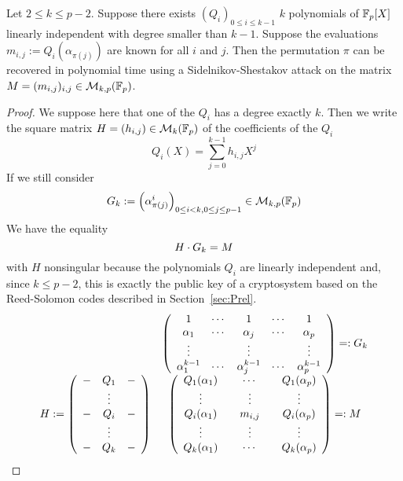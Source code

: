 \documentclass[a4paper]{article}
\newcommand{\GF}[1]{\F_{#1}}
\begin{document}
\begin{theorem}
\label{thm:link}
Let $2 \leq k \leq p-2$.
Suppose there exists $(Q_i)_{0 \leq i \leq k-1}$ $k$ polynomials of $\GF{p}[X]$ linearly independent with degree smaller than $k-1$.
Suppose the evaluations $m_{i,j} := Q_i(\alpha_{\pi(j)})$ are known for all $i$ and $j$.
Then the permutation $\pi$ can be recovered in polynomial time using a Sidelnikov-Shestakov attack on the matrix $M = (m_{i,j})_{i,j} \in \mathcal{M}_{k,p}(\GF{p})$.
\end{theorem}
\begin{proof}
We suppose here that one of the $Q_i$ has a degree exactly $k$.
Then we write the square matrix $H = (h_{i,j}) \in \mathcal{M}_k(\GF{p})$ of the coefficients of the $Q_i$
$$ Q_i(X) = \sum_{j=0}^{k-1} h_{i,j} X^j $$
If we still consider
$$ \A_k := \left( \alpha_{\pi(j)}^i \right)_{0 \leq i < k, 0 \leq j \leq p-1} \in \mathcal{M}_{k,p}(\GF{p})$$
We have the equality
$$ H \cdot G_k = M$$
with $H$ nonsingular because the polynomials $Q_i$ are linearly independent and, since $k \leq p-2$, this is exactly the public key of a cryptosystem based on the Reed-Solomon codes described in Section~\ref{sec:Prel}.
$$
\begin{array}{ccl}
& \left( \begin{array}{ccccc}
1&\cdots&1&\cdots&1\\
\alpha_1&\cdots&\alpha_j&\cdots&\alpha_p\\
\vdots&&\vdots&&\vdots \\
\alpha_1^{k-1}&\cdots&\alpha_j^{k-1}&\cdots&\alpha_p^{k-1}
\end{array} \right) =: G_k \\
H := \left( \begin{array}{ccc}
-&Q_1&-  \\
&\vdots& \\
-&Q_i&-  \\
&\vdots& \\
-&Q_k&-
\end{array} \right) &
\left( \begin{array}{ccccc}
Q_1(\alpha_1)&&\cdots&&Q_1(\alpha_p)\\
\vdots&&\vdots&&\vdots \\
Q_i(\alpha_1)&&m_{i,j}&&Q_i(\alpha_p)\\
\vdots&&\vdots&&\vdots \\
Q_k(\alpha_1)&&\cdots&&Q_k(\alpha_p)
\end{array} \right) =: M \\
\end{array}
$$
\end{proof}
\end{document}

